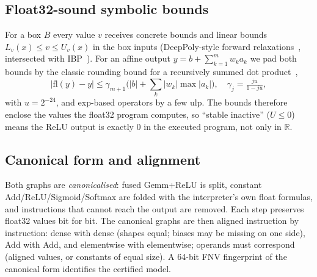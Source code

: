 \documentclass[conference]{IEEEtran}
\begin{document}
\subsection{Float32-sound symbolic bounds}
For a box $B$ every value $v$ receives concrete bounds and linear bounds $L_v(x)\le v\le U_v(x)$ in the box inputs (DeepPoly-style forward relaxations~\cite{deeppoly,reluval}, intersected with IBP~\cite{ibp}). For an affine output $y=b+\sum_{k=1}^{m}w_k a_k$ we pad both bounds by the classic rounding bound for a recursively summed dot product~\cite{higham},
\begin{equation}
|\mathrm{fl}(y)-y|\le\gamma_{m+1}\Big(|b|+\sum_k|w_k|\max|a_k|\Big),\quad \gamma_j=\tfrac{ju}{1-ju},
\end{equation}
with $u=2^{-24}$, and exp-based operators by a few ulp. The bounds therefore enclose the values the float32 program computes, so ``stable inactive'' ($U\le0$) means the ReLU output is exactly $0$ in the executed program, not only in $\mathbb{R}$.

\subsection{Canonical form and alignment}
Both graphs are \emph{canonicalised}: fused Gemm+ReLU is split, constant Add/ReLU/Sigmoid/Softmax are folded with the interpreter's own float formulas, and instructions that cannot reach the output are removed. Each step preserves float32 values bit for bit. The canonical graphs are then aligned instruction by instruction: dense with dense (shapes equal; biases may be missing on one side), Add with Add, and elementwise with elementwise; operands must correspond (aligned values, or constants of equal size). A 64-bit FNV fingerprint of the canonical form identifies the certified model.
\end{document}
